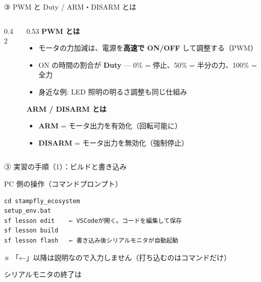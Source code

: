 \begin{frame}{③ PWM と Duty / ARM・DISARM とは}
  \begin{columns}[T]
    \begin{column}{0.42\textwidth}
      \begin{center}
        \resizebox{!}{0.6\textheight}{}
      \end{center}
    \end{column}
    \begin{column}{0.53\textwidth}
      \textbf{PWM とは}
      \begin{itemize}\small
        \item モータの力加減は、電源を\textbf{高速で ON/OFF} して調整する（PWM）
        \item ON の時間の割合が \textbf{Duty} --- 0\% = 停止、50\% = 半分の力、100\% = 全力
        \item 身近な例: LED 照明の明るさ調整も同じ仕組み
      \end{itemize}

      \vspace{0.4em}

      \textbf{ARM / DISARM とは}
      \begin{itemize}\small
        \item \textbf{ARM} = モータ出力を有効化（回転可能に）
        \item \textbf{DISARM} = モータ出力を無効化（強制停止）
      \end{itemize}
    \end{column}
  \end{columns}
\end{frame}

\begin{frame}[fragile]{③ 実習の手順（1）：ビルドと書き込み}
  \begin{block}{PC 側の操作（コマンドプロンプト）}
    \begin{lstlisting}[style=sfbash, numbers=none]
cd stampfly_ecosystem
setup_env.bat
sf lesson edit    ← VSCodeが開く。コードを編集して保存
sf lesson build
sf lesson flash   ← 書き込み後シリアルモニタが自動起動
    \end{lstlisting}
  \end{block}

  {\footnotesize ※ 「←」以降は説明なので入力しません（打ち込むのはコマンドだけ）}

  \vspace{0.2em}

  {\footnotesize シリアルモニタの終了は \code{Ctrl+]}}
\end{frame}

